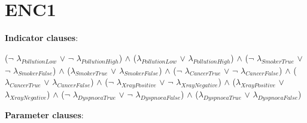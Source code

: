 \section{ENC1}
\label{ENC1}
\textbf{Indicator clauses}: 
\begin{center}
($\neg$ $\lambda_{PollutionLow}$ $\lor$ $\neg$ $\lambda_{PollutionHigh}$) $\land$ 
($\lambda_{PollutionLow}$ $\lor$ $\lambda_{PollutionHigh}$) $\land$ 
($\neg$ $\lambda_{SmokerTrue}$ $\lor$ $\neg$ $\lambda_{SmokerFalse}$) $\land$ 
($\lambda_{SmokerTrue}$ $\lor$ $\lambda_{SmokerFalse}$) $\land$ 
($\neg$ $\lambda_{CancerTrue}$ $\lor$ $\neg$ $\lambda_{CancerFalse}$) $\land$ 
($\lambda_{CancerTrue}$ $\lor$ $\lambda_{CancerFalse}$) $\land$ 
($\neg$ $\lambda_{XrayPositive}$ $\lor$ $\neg$ $\lambda_{XrayNegative}$) $\land$ 
($\lambda_{XrayPositive}$ $\lor$ $\lambda_{XrayNegative}$) $\land$ 
($\neg$ $\lambda_{DyspnoeaTrue}$ $\lor$ $\neg$ $\lambda_{DyspnoeaFalse}$) $\land$ 
($\lambda_{DyspnoeaTrue}$ $\lor$ $\lambda_{DyspnoeaFalse}$)
\end{center}
\textbf{Parameter clauses}: 
